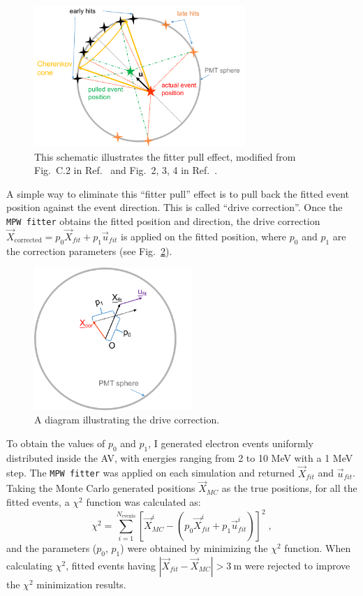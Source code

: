 \begin{figure}[!htb]
	\centering
	\includegraphics[width=8cm]{fitterPull.png}
\caption[A cartoon shows fitter pull effect.]{This schematic illustrates the fitter pull effect, modified from Fig.~C.2 in Ref.~\cite{brice1996monte} and Fig.~2, 3, 4 in Ref.~\cite{driveCorPeter}.}
	\label{fitterPull}
\end{figure}

A simple way to eliminate this ``fitter pull'' effect is to pull back the fitted event position against the event direction. This is called ``drive correction''. Once the \texttt{MPW fitter} obtains the fitted position and direction, the drive correction $\vec{X}_{\mathrm{corrected}} = p_0\vec{X}_{fit}+p_1\vec{u}_{fit}$ is applied on the fitted position, where $p_0$ and $p_1$ are the correction parameters (see Fig.~\ref{drivecor}).
\begin{figure}[!htb]
	\centering
	\includegraphics[width=6cm]{driveCor.png}
	\caption{ A diagram illustrating the drive correction.}
	\label{drivecor}
\end{figure}

To obtain the values of $p_0$ and $p_1$, I generated electron events uniformly distributed inside the AV, with energies ranging from 2 to 10 MeV with a 1 MeV step. The \texttt{MPW fitter} was applied on each simulation and returned $\vec{X}_{fit}$ and $\vec{u}_{fit}$. Taking the Monte Carlo generated positions $\vec{X}_{MC}$ as the true positions, for all the fitted events, a $\chi^2$ function was calculated as:
\begin{equation}
\chi^2 = \sum_{i=1}^{N_{\mathrm{events}}}[\vec{X}^i_{MC}-(p_0\vec{X}^i_{fit}+p_1\vec{u}^i_{fit})]^2 \; ,
\end{equation}
and the parameters ($p_0$, $p_1$) were obtained by minimizing the $\chi^2$ function. When calculating $\chi^2$, fitted events having $|\vec{X}_{fit}-\vec{X}_{MC}| > 3~\mathrm{m}$ were rejected to improve the $\chi^2$ minimization results.

